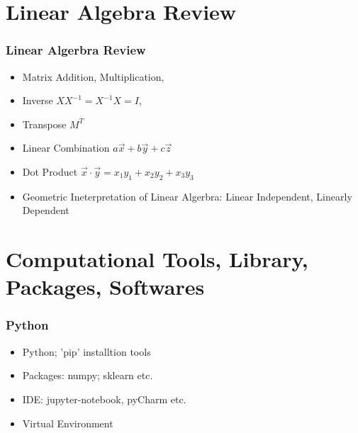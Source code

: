 \documentclass[notheorems, aspectratio=54]{beamer}
\begin{document}
\section{Linear Algebra Review}
\begin{frame}
\frametitle{Linear Algerbra Review}
\begin{itemize}
\item Matrix Addition, Multiplication, 
\item Inverse $XX^{-1}=X^{-1}X=I$, 
\item Transpose $M^{T}$
\item Linear Combination $a\vec{x}+b\vec{y}+c\vec{z}$
\item Dot Product $\vec{x}\cdot\vec{y}=x_1 y_1+x_2 y_2+x_3 y_3$
\item Geometric Ineterpretation of Linear Algerbra: Linear Independent, Linearly Dependent
\end{itemize}
\end{frame}


\section{Computational Tools, Library, Packages, Softwares}
\begin{frame}
\frametitle{Python}
\begin{itemize}
\item Python; 'pip' installtion tools
\item Packages: numpy; sklearn etc.
\item IDE: jupyter-notebook, pyCharm etc.
\item Virtual Environment
\end{itemize}
\end{frame}
\end{document}
